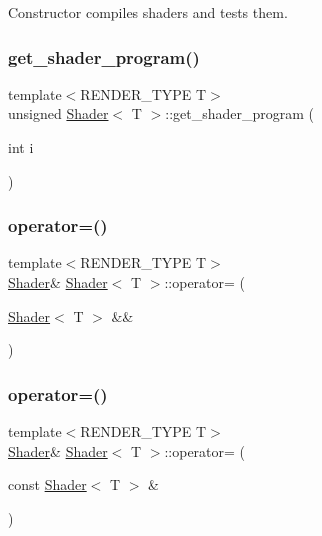 Constructor compiles shaders and tests them. 

\mbox{\label{classShader_a2c19b216850480109f9d5f7ed6ab6aa6}} 
\subsubsection{\texorpdfstring{get\+\_\+shader\+\_\+program()}{get\_shader\_program()}}
{\footnotesize\ttfamily template$<$R\+E\+N\+D\+E\+R\+\_\+\+T\+Y\+PE T$>$ \\
unsigned \mbox{\hyperlink{classShader}{Shader}}$<$ T $>$\+::get\+\_\+shader\+\_\+program (\begin{DoxyParamCaption}\item[{int}]{i }\end{DoxyParamCaption})\hspace{0.3cm}{\ttfamily [inline]}}

\mbox{\label{classShader_a3b92fece66095389581a2bf6b3124657}} 
\subsubsection{\texorpdfstring{operator=()}{operator=()}\hspace{0.1cm}{\footnotesize\ttfamily [1/2]}}
{\footnotesize\ttfamily template$<$R\+E\+N\+D\+E\+R\+\_\+\+T\+Y\+PE T$>$ \\
\mbox{\hyperlink{classShader}{Shader}}\& \mbox{\hyperlink{classShader}{Shader}}$<$ T $>$\+::operator= (\begin{DoxyParamCaption}\item[{\mbox{\hyperlink{classShader}{Shader}}$<$ T $>$ \&\&}]{ }\end{DoxyParamCaption})\hspace{0.3cm}{\ttfamily [delete]}}

\mbox{\label{classShader_a58f724fecccecdb1633e08ce0258da37}} 
\subsubsection{\texorpdfstring{operator=()}{operator=()}\hspace{0.1cm}{\footnotesize\ttfamily [2/2]}}
{\footnotesize\ttfamily template$<$R\+E\+N\+D\+E\+R\+\_\+\+T\+Y\+PE T$>$ \\
\mbox{\hyperlink{classShader}{Shader}}\& \mbox{\hyperlink{classShader}{Shader}}$<$ T $>$\+::operator= (\begin{DoxyParamCaption}\item[{const \mbox{\hyperlink{classShader}{Shader}}$<$ T $>$ \&}]{ }\end{DoxyParamCaption})\hspace{0.3cm}{\ttfamily [delete]}}



